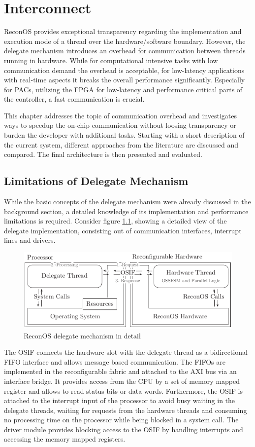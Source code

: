 \chapter{Interconnect}
\label{sec:interconnect}
ReconOS provides exceptional transparency regarding the implementation and
execution mode of a thread over the hardware/software boundary. However, the
delegate mechanism introduces an overhead for communication between threads
running in hardware. While for computational intensive tasks with low
communication demand the overhead is acceptable, for low-latency applications
with real-time aspects it breaks the overall performance significantly.
Especially for \acp{PAC}, utilizing the \ac{FPGA} for low-latency and
performance critical parts of the controller, a fast communication is crucial.

This chapter addresses the topic of communication overhead and investigates
ways to speedup the on-chip communication without loosing transparency or
burden the developer with additional tasks. Starting with a short description
of the current system, different approaches from the literature are discussed
and compared. The final architecture is then presented and evaluated.

\section{Limitations of Delegate Mechanism}
While the basic concepts of the delegate mechanism were already discussed in
the background section, a detailed knowledge of its implementation and
performance limitations is required. Consider figure \ref{fig:delegate},
showing a detailed view of the delegate implementation, consisting out of
communication interfaces, interrupt lines and drivers.
\begin{figure}[tb]
	\centering
	\includegraphics{../figures/delegate}
	\caption{ReconOS delegate mechanism in detail}
	\label{fig:delegate}
\end{figure}
 The \ac{OSIF} connects the hardware slot with the delegate thread as a
bidirectional \ac{FIFO} interface and allows message based communication. The
\acp{FIFO} are implemented in the reconfigurable fabric and attached to the
\ac{AXI} bus via an interface bridge. It provides access from the \ac{CPU} by
a set of memory mapped register and allows to read status bits or data words.
Furthermore, the \ac{OSIF} is attached to the interrupt input of the processor
to avoid busy waiting in the delegate threads, waiting for requests from the
hardware threads and consuming no processing time on the processor while being
blocked in a system call. The driver module provides blocking access to the
\ac{OSIF} by handling interrupts and accessing the memory mapped registers.

